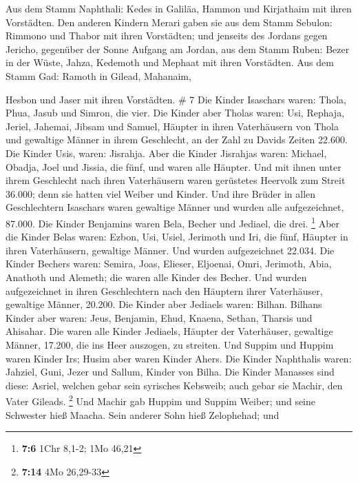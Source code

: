  Aus dem Stamm Naphthali: Kedes in Galiläa, Hammon und
Kirjathaim mit ihren Vorstädten.  Den anderen Kindern
Merari gaben sie aus dem Stamm Sebulon: Rimmono und Thabor mit ihren
Vorstädten;  und jenseits des Jordans gegen Jericho,
gegenüber der Sonne Aufgang am Jordan, aus dem Stamm Ruben: Bezer in der
Wüste, Jahza,  Kedemoth und Mephaat mit ihren Vorstädten.
 Aus dem Stamm Gad: Ramoth in Gilead, Mahanaim,

 Hesbon und Jaser mit ihren Vorstädten. \# 7
 Die Kinder Isaschars waren: Thola, Phua, Jasub und
Simron, die vier.  Die Kinder aber Tholas waren: Usi,
Rephaja, Jeriel, Jahemai, Jibsam und Samuel, Häupter in ihren
Vaterhäusern von Thola und gewaltige Männer in ihrem Geschlecht, an der
Zahl zu Davids Zeiten 22.600.  Die Kinder Usis, waren:
Jisrahja. Aber die Kinder Jisrahjas waren: Michael, Obadja, Joel und
Jissia, die fünf, und waren alle Häupter.  Und mit ihnen
unter ihrem Geschlecht nach ihren Vaterhäusern waren gerüstetes Heervolk
zum Streit 36.000; denn sie hatten viel Weiber und Kinder.
 Und ihre Brüder in allen Geschlechtern Isaschars waren
gewaltige Männer und wurden alle aufgezeichnet, 87.000. 
Die Kinder Benjamins waren Bela, Becher und Jediael, die drei.
\footnote{\textbf{7:6} 1Chr 8,1-2; 1Mo 46,21}  Aber die
Kinder Belas waren: Ezbon, Usi, Usiel, Jerimoth und Iri, die fünf,
Häupter in ihren Vaterhäusern, gewaltige Männer. Und wurden
aufgezeichnet 22.034.  Die Kinder Bechers waren: Semira,
Joas, Elieser, Eljoenai, Omri, Jerimoth, Abia, Anathoth und Alemeth; die
waren alle Kinder des Becher.  Und wurden aufgezeichnet in
ihren Geschlechtern nach den Häuptern ihrer Vaterhäuser, gewaltige
Männer, 20.200.  Die Kinder aber Jediaels waren: Bilhan.
Bilhans Kinder aber waren: Jeus, Benjamin, Ehud, Knaena, Sethan, Tharsis
und Ahisahar.  Die waren alle Kinder Jediaels, Häupter
der Vaterhäuser, gewaltige Männer, 17.200, die ins Heer auszogen, zu
streiten.  Und Suppim und Huppim waren Kinder Irs; Husim
aber waren Kinder Ahers.  Die Kinder Naphthalis waren:
Jahziel, Guni, Jezer und Sallum, Kinder von Bilha.  Die
Kinder Manasses sind diese: Asriel, welchen gebar sein syrisches
Kebsweib; auch gebar sie Machir, den Vater Gileads. \footnote{\textbf{7:14}
  4Mo 26,29-33}  Und Machir gab Huppim und Suppim Weiber;
und seine Schwester hieß Maacha. Sein anderer Sohn hieß Zelophehad; und
